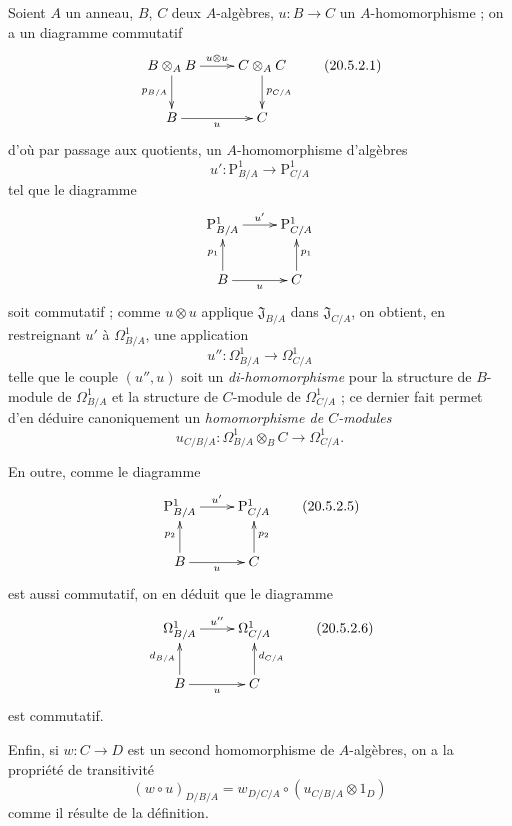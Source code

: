 \begin{env}[20.5.2]
\label{0.20.5.2-fr}
Soient $A$ un anneau, $B$, $C$ deux $A$-algèbres, $u:B\to C$ un
$A$-homomorphisme ; on a un diagramme commutatif
\[
\xymatrix{
  B\otimes_A B \ar[r]^{u\otimes u} \ar[d]_{p_{B/A}} &
  C\otimes_A C \ar[d]^{p_{C/A}} \\
  B \ar[r]_u & C
}
\tag{20.5.2.1}
\label{0.20.5.2.1-fr}
\]
d'où par passage aux quotients, un $A$-homomorphisme d'algèbres
\begin{equation}
\tag{20.5.2.2}
\label{0.20.5.2.2-fr}
  u':\mathrm{P}^1_{B/A}\to\mathrm{P}^1_{C/A}
\end{equation}
tel que le diagramme
\[
\xymatrix{
  \mathrm{P}^1_{B/A} \ar[r]^{u'} & \mathrm{P}^1_{C/A} \\
  B \ar[u]^{p_1} \ar[r]_u & C \ar[u]_{p_1}
}
\]
soit commutatif ; comme $u\otimes u$ applique $\mathfrak{J}_{B/A}$ dans
$\mathfrak{J}_{C/A}$, on obtient, en restreignant $u'$ à
$\Omega^1_{B/A}$, une application
\begin{equation}
\tag{20.5.2.3}
\label{0.20.5.2.3-fr}
  u'':\Omega^1_{B/A}\to\Omega^1_{C/A}
\end{equation}
telle que le couple $(u'',u)$ soit un \emph{di-homomorphisme} pour la
structure de $B$-module de $\Omega^1_{B/A}$ et la structure de $C$-module de
$\Omega^1_{C/A}$ ; ce dernier fait permet d'en déduire canoniquement un
\emph{homomorphisme de $C$-modules}
\begin{equation}
\tag{20.5.2.4}
\label{0.20.5.2.4-fr}
  u_{C/B/A}:\Omega^1_{B/A}\otimes_B C\to\Omega^1_{C/A}.
\end{equation}

En outre, comme le diagramme
\[
\xymatrix{
  \mathrm{P}^1_{B/A} \ar[r]^{u'} & \mathrm{P}^1_{C/A} \\
  B \ar[u]^{p_2} \ar[r]_u & C \ar[u]_{p_2}
}
\tag{20.5.2.5}
\label{0.20.5.2.5-fr}
\]
est aussi commutatif, on en déduit que le diagramme
\[
\xymatrix{
  \Omega^1_{B/A} \ar[r]^{u''} & \Omega^1_{C/A} \\
  B \ar[u]^{d_{B/A}} \ar[r]_u & C \ar[u]_{d_{C/A}}
}
\tag{20.5.2.6}
\label{0.20.5.2.6-fr}
\]
est commutatif.

Enfin, si $w:C\to D$ est un second homomorphisme de $A$-algèbres, on a la
propriété de transitivité
\begin{equation}
\tag{20.5.2.7}
\label{0.20.5.2.7-fr}
  (w\circ u)_{D/B/A}
  =w_{D/C/A}\circ(u_{C/B/A}\otimes1_D)
\end{equation}
comme il résulte de la définition.
\end{env}

